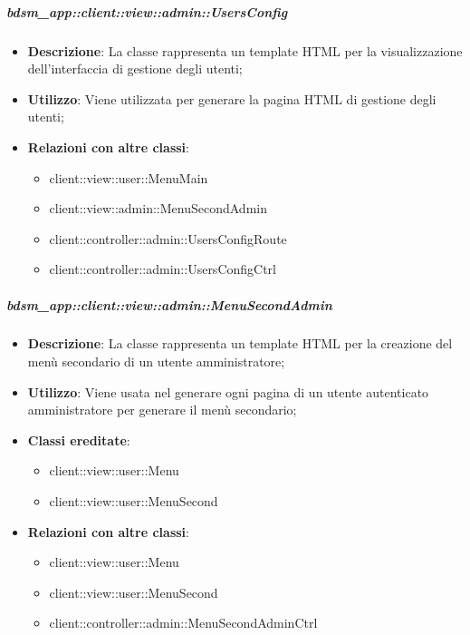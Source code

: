 		\subparagraph{bdsm\_app::client::view::admin::UsersConfig} %
		\label{subp:bdsm_app_client_view_admin_usersconfig}
			\begin{itemize}
				\item \textbf{Descrizione}: La classe rappresenta un template HTML per la visualizzazione dell'interfaccia di gestione degli utenti;
				\item \textbf{Utilizzo}: Viene utilizzata per generare la pagina HTML di gestione degli utenti;
				\item \textbf{Relazioni con altre classi}:
					\begin{itemize}
						\item client::view::user::MenuMain
						\item client::view::admin::MenuSecondAdmin
						\item client::controller::admin::UsersConfigRoute
						\item client::controller::admin::UsersConfigCtrl
					\end{itemize}
			\end{itemize}

		\subparagraph{bdsm\_app::client::view::admin::MenuSecondAdmin} %
		\label{subp:bdsm_app_client_view_admin_menusecondadmin}
			\begin{itemize}
				\item \textbf{Descrizione}: La classe rappresenta un template HTML per la creazione del menù secondario di un utente amministratore;
				\item \textbf{Utilizzo}: Viene usata nel generare ogni pagina di un utente autenticato amministratore per generare il menù secondario;
				\item \textbf{Classi ereditate}:
					\begin{itemize}
						\item client::view::user::Menu
						\item client::view::user::MenuSecond
					\end{itemize}
				\item \textbf{Relazioni con altre classi}:
					\begin{itemize}
						\item client::view::user::Menu
						\item client::view::user::MenuSecond
						\item client::controller::admin::MenuSecondAdminCtrl
					\end{itemize}
			\end{itemize}

